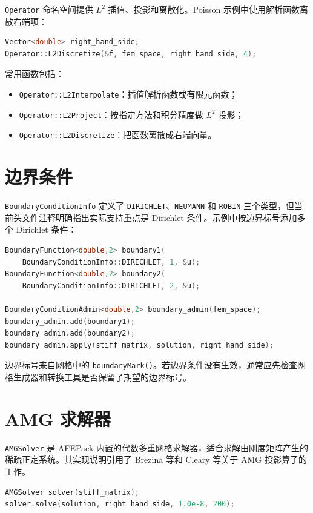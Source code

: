 \documentclass[UTF8,openany,zihao=-4,scheme=chinese]{ctexbook}
\newcommand{\class}[1]{\texttt{#1}}
\begin{document}
\class{Operator} 命名空间提供 $L^2$ 插值、投影和离散化。Poisson 示例中使用解析函数离散右端项：

\begin{lstlisting}[language=C++]
Vector<double> right_hand_side;
Operator::L2Discretize(&f, fem_space, right_hand_side, 4);
\end{lstlisting}

常用函数包括：

\begin{itemize}[leftmargin=2em]
  \item \class{Operator::L2Interpolate}：插值解析函数或有限元函数；
  \item \class{Operator::L2Project}：按指定方法和积分精度做 $L^2$ 投影；
  \item \class{Operator::L2Discretize}：把函数离散成右端向量。
\end{itemize}

\section{边界条件}

\class{BoundaryConditionInfo} 定义了 \class{DIRICHLET}、\class{NEUMANN} 和 \class{ROBIN} 三个类型，但当前头文件注释明确指出实际支持重点是 Dirichlet 条件。示例中按边界标号添加多个 Dirichlet 条件：

\begin{lstlisting}[language=C++]
BoundaryFunction<double,2> boundary1(
    BoundaryConditionInfo::DIRICHLET, 1, &u);
BoundaryFunction<double,2> boundary2(
    BoundaryConditionInfo::DIRICHLET, 2, &u);

BoundaryConditionAdmin<double,2> boundary_admin(fem_space);
boundary_admin.add(boundary1);
boundary_admin.add(boundary2);
boundary_admin.apply(stiff_matrix, solution, right_hand_side);
\end{lstlisting}

边界标号来自网格中的 \class{boundaryMark()}。若边界条件没有生效，通常应先检查网格生成器和转换工具是否保留了期望的边界标号。

\section{AMG 求解器}

\class{AMGSolver} 是 AFEPack 内置的代数多重网格求解器，适合求解由刚度矩阵产生的稀疏正定系统。其实现说明引用了 Brezina 等和 Cleary 等关于 AMG 投影算子的工作\cite{brezina2000amg,cleary2000robust}。

\begin{lstlisting}[language=C++]
AMGSolver solver(stiff_matrix);
solver.solve(solution, right_hand_side, 1.0e-8, 200);
\end{lstlisting}
\end{document}

